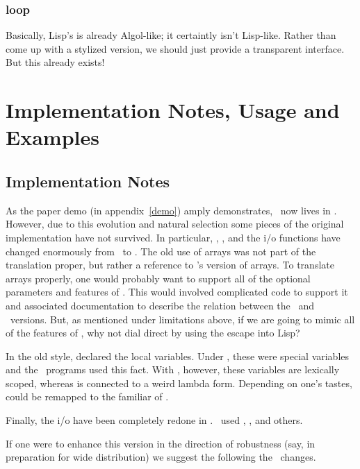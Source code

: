 \subsubsection{loop}

Basically, Lisp's  is already Algol-like; it certaintly isn't
Lisp-like.  Rather than come up with a stylized version, we should just
provide a transparent interface.  But this already exists!


\section {Implementation Notes, Usage and Examples}

\subsection {Implementation Notes}

As the paper demo (in appendix~\ref{demo}) amply demonstrates, \cgol\ now
lives in \cl.  However, due to this evolution and natural selection some
pieces of the original implementation have not survived.  In particular,
, , and the {\sc i/o} functions have
changed enormously from \ml\ to \cl.  The old use of arrays was not part of
the translation proper, but rather a reference to \cgol's version of
arrays.  To translate arrays properly, one would probably want to support
all of the optional parameters and features of \cl.  This would involved
complicated code to support it and associated documentation to describe the
relation between the \cgol\ and \cl\ versions.  But, as mentioned under
limitations above, if we are going to mimic all of the features of \cl, why
not dial direct by using the escape into Lisp?

In the old style,  declared the local variables.  Under \ml,
these were special variables and the \cgol\ programs used this fact.  With
\cl, however, these variables are lexically scoped, whereas
 is connected to a weird lambda form.  Depending on
one's tastes,  could be remapped to the familiar  of
\cl.

Finally, the {\sc i/o} have been completely redone in \cl.  \ml\ used
, ,  and others.

If one were to enhance this version in
the direction of  robustness
(say, in preparation for wide distribution)
we suggest the following
the \cgol\ changes.


